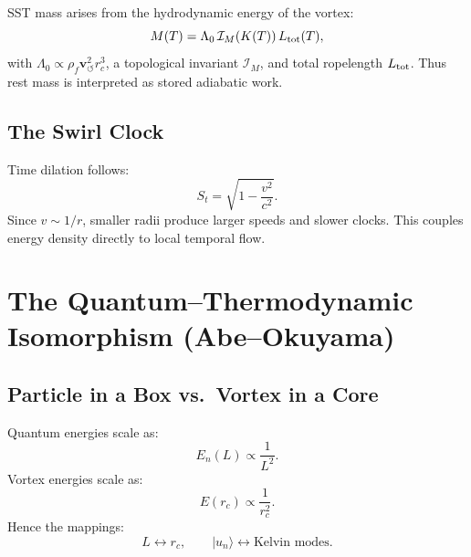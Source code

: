 \documentclass[11pt]{article}
\newcommand{\rhof}{\rho_{\!f}} \newcommand{\rhoF}{\rho_{\!f}}                             %
\newcommand{\rc}{r_c}                                    %
\begin{document}
            SST mass arises from the hydrodynamic energy of the vortex:
            \begin{equation}
                M(T) = \Lambda_0 \, \mathcal{I}_M(K(T)) \, L_{\rm tot}(T),
            \end{equation}
            with $\Lambda_0 \propto \rhof \mathbf{v}_{\scriptscriptstyle\boldsymbol{\circlearrowleft}}^2 \rc^3$, a topological
            invariant $\mathcal{I}_M$, and total ropelength $L_{\rm tot}$.
            Thus rest mass is interpreted as stored adiabatic work.

        \subsection{The Swirl Clock}

            Time dilation follows:
            \begin{equation}
                S_t = \sqrt{1 - \frac{v^2}{c^2}}.
            \end{equation}
            Since $v \sim 1/r$, smaller radii produce larger speeds and slower clocks.
            This couples energy density directly to local temporal flow.

    \section{The Quantum--Thermodynamic Isomorphism (Abe--Okuyama)}

        \subsection{Particle in a Box vs.\ Vortex in a Core}

            Quantum energies scale as:
            \begin{equation}
                E_n(L) \propto \frac{1}{L^2}.
            \end{equation}
            Vortex energies scale as:
            \begin{equation}
                E(\rc) \propto \frac{1}{\rc^2}.
            \end{equation}
            Hence the mappings:
            \begin{equation}
                L \leftrightarrow \rc, \qquad
                |u_n\rangle \leftrightarrow \text{Kelvin modes}.
            \end{equation}
\end{document}
